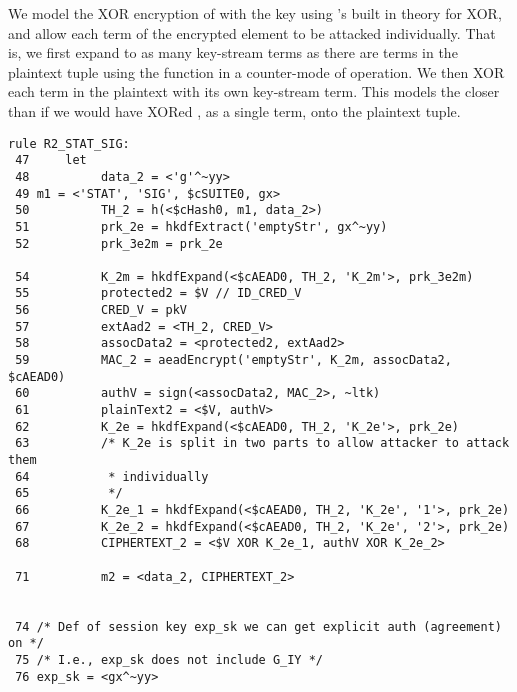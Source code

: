 %
We model the XOR encryption of  with the key  using
\mTamarin{}'s built in theory for XOR, and allow each term of the encrypted
element to be attacked individually.
%
That is, we first expand  to as many key-stream terms as there are
terms in the plaintext tuple using the \mHkdfExpand{} function in a counter-mode
of operation.
%
We then XOR each term in the plaintext with its own key-stream term.
%
This models the \mSpec{} closer than if we would have XORed , as a
single term, onto the plaintext tuple.
%

\begin{lstlisting}
rule R2_STAT_SIG:
 47     let
 48          data_2 = <'g'^~yy>
 49 m1 = <'STAT', 'SIG', $cSUITE0, gx>
 50          TH_2 = h(<$cHash0, m1, data_2>)
 51          prk_2e = hkdfExtract('emptyStr', gx^~yy)
 52          prk_3e2m = prk_2e

 54          K_2m = hkdfExpand(<$cAEAD0, TH_2, 'K_2m'>, prk_3e2m)
 55          protected2 = $V // ID_CRED_V
 56          CRED_V = pkV
 57          extAad2 = <TH_2, CRED_V>
 58          assocData2 = <protected2, extAad2>
 59          MAC_2 = aeadEncrypt('emptyStr', K_2m, assocData2, $cAEAD0)
 60          authV = sign(<assocData2, MAC_2>, ~ltk)
 61          plainText2 = <$V, authV>
 62          K_2e = hkdfExpand(<$cAEAD0, TH_2, 'K_2e'>, prk_2e)
 63          /* K_2e is split in two parts to allow attacker to attack them
 64           * individually
 65           */
 66          K_2e_1 = hkdfExpand(<$cAEAD0, TH_2, 'K_2e', '1'>, prk_2e)
 67          K_2e_2 = hkdfExpand(<$cAEAD0, TH_2, 'K_2e', '2'>, prk_2e)
 68          CIPHERTEXT_2 = <$V XOR K_2e_1, authV XOR K_2e_2>

 71          m2 = <data_2, CIPHERTEXT_2>


 74 /* Def of session key exp_sk we can get explicit auth (agreement) on */
 75 /* I.e., exp_sk does not include G_IY */
 76 exp_sk = <gx^~yy>
\end{lstlisting}

